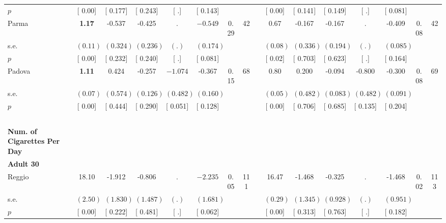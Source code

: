 \begin{longtable}{L{8em} c c c c c c c p{1em} c c c c c c c}
\quad \quad \quad \quad $ p$ & [     0.00] & [    0.177] & [    0.243] & [        .] & [    0.143] & & & & [     0.00] & [    0.141] & [    0.149] & [        .] & [    0.081] & &  \\[1em]
\quad \quad \quad Parma& \textbf{     1.17} &    -0.537 &    -0.425 &         . & $ \mathbf{   -0.549}$ &      0.29 &        42 & & 0.67 &    -0.167 &    -0.167 &         . &    -0.409 &      0.08 &        42  \\*
\quad \quad \quad \quad s.e.& $ (     0.11)$ & $ (    0.324)$ & $ (    0.236)$ & $ (        .)$ & $ (    0.174)$ & & & & $ (     0.08)$ & $ (    0.336)$ & $ (    0.194)$ & $ (        .)$ & $ (    0.085)$ & &  \\*
\quad \quad \quad \quad $ p$ & [     0.00] & [    0.232] & [    0.240] & [        .] & [    0.081] & & & & [     0.02] & [    0.703] & [    0.623] & [        .] & [    0.164] & &  \\[1em]
\quad \quad \quad Padova& \textbf{     1.11} &     0.424 &    -0.257 & $ \mathbf{   -1.074}$ &    -0.367 &      0.15 &        68 & & 0.80 &     0.200 &    -0.094 &    -0.800 &    -0.300 &      0.08 &        69  \\*
\quad \quad \quad \quad s.e.& $ (     0.07)$ & $ (    0.574)$ & $ (    0.126)$ & $ (    0.482)$ & $ (    0.160)$ & & & & $ (     0.05)$ & $ (    0.482)$ & $ (    0.083)$ & $ (    0.482)$ & $ (    0.091)$ & &  \\*
\quad \quad \quad \quad $ p$ & [     0.00] & [    0.444] & [    0.290] & [    0.051] & [    0.128] & & & & [     0.00] & [    0.706] & [    0.685] & [    0.135] & [    0.204] & &  \\[1em]
~\\[1em]
\textbf{Num. of Cigarettes Per Day} \\*
\quad \quad \textbf{Adult 30} & & & & & & & & & & & & & & & \\* 
\quad \quad \quad Reggio& 18.10 &    -1.912 &    -0.806 &         . & $ \mathbf{   -2.235}$ &      0.05 &       111 & & 16.47 &    -1.468 &    -0.325 &         . &    -1.468 &      0.02 &       113  \\*
\quad \quad \quad \quad s.e.& $ (     2.50)$ & $ (    1.830)$ & $ (    1.487)$ & $ (        .)$ & $ (    1.681)$ & & & & $ (     0.29)$ & $ (    1.345)$ & $ (    0.928)$ & $ (        .)$ & $ (    0.951)$ & &  \\*
\quad \quad \quad \quad $ p$ & [     0.00] & [    0.222] & [    0.481] & [        .] & [    0.062] & & & & [     0.00] & [    0.313] & [    0.763] & [        .] & [    0.182] & &  \\[1em]

\end{longtable}

